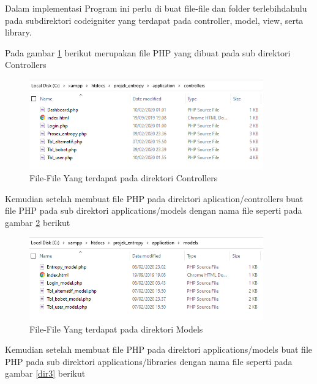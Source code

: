 Dalam implementasi Program ini perlu di buat file-file dan folder terlebihdahulu pada subdirektori codeigniter yang terdapat pada controller, model, view, serta library. 

Pada gambar \ref{dir1} berikut merupakan file PHP yang dibuat pada sub direktori Controllers

\begin{figure}[!htbp]
	\centerline{\includegraphics[width=0.90\textwidth]{figures/dir/1.png}}
	\caption{File-File Yang terdapat pada direktori Controllers}
	\label{dir1}
\end{figure}
\pagebreak
Kemudian setelah membuat file PHP pada direktori aplication/controllers  buat file PHP pada sub direktori applications/models dengan nama file seperti pada gambar \ref{dir2} berikut

\begin{figure}[!htbp]
	\centerline{\includegraphics[width=0.90\textwidth]{figures/dir/2.png}}
	\caption{File-File Yang terdapat pada direktori Models}
	\label{dir2}
\end{figure}

Kemudian setelah membuat file PHP pada direktori applications/models buat file PHP pada sub direktori applications/libraries dengan nama file seperti pada gambar \ref{dir3} berikut

